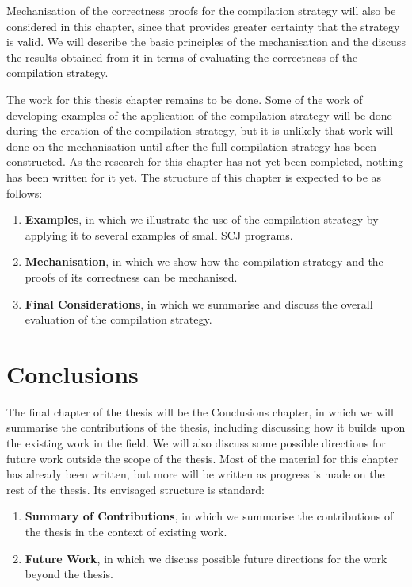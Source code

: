 \documentclass[a4paper,10pt]{report}
\let\olditem\item
\renewcommand{\item}[1][]{\olditem{\bfseries #1}}
\begin{document}
Mechanisation of the correctness proofs for the compilation strategy
will also be considered in this chapter, since that provides greater
certainty that the strategy is valid.
We will describe the basic principles of the mechanisation and the
discuss the results obtained from it in terms of evaluating the
correctness of the compilation strategy.

The work for this thesis chapter remains to be done.
Some of the work of developing examples of the application of the
compilation strategy will be done during the creation of the
compilation strategy, but it is unlikely that work will done on the
mechanisation until after the full compilation strategy has been
constructed.
As the research for this chapter has not yet been completed, nothing
has been written for it yet.
The structure of this chapter is expected to be as follows:
\begin{enumerate}
\item[Examples], in which we illustrate the use of the compilation
  strategy by applying it to several examples of small SCJ programs.
\item[Mechanisation], in which we show how the compilation strategy
  and the proofs of its correctness can be mechanised.
\item[Final Considerations], in which we summarise and discuss the
  overall evaluation of the compilation strategy.
\end{enumerate}

\section{Conclusions}

The final chapter of the thesis will be the Conclusions chapter, in
which we will summarise the contributions of the thesis, including
discussing how it builds upon the existing work in the field.
We will also discuss some possible directions for future work outside
the scope of the thesis.
Most of the material for this chapter has already been written, but
more will be written as progress is made on the rest of the thesis.
Its envisaged structure is standard:
\begin{enumerate}
\item[Summary of Contributions], in which we summarise the
  contributions of the thesis in the context of existing work.
\item[Future Work], in which we discuss possible future directions for
  the work beyond the thesis.
\end{enumerate}
\end{document}

